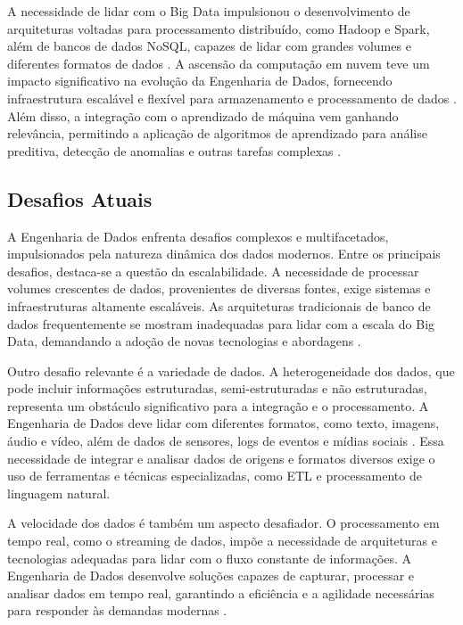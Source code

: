 A necessidade de lidar com o Big Data impulsionou o desenvolvimento de arquiteturas voltadas para processamento distribuído, como Hadoop e Spark, 
além de bancos de dados NoSQL, capazes de lidar com grandes volumes e diferentes formatos de dados \cite{volk2019challenging}. A ascensão da computação em nuvem 
teve um impacto significativo na evolução da Engenharia de Dados, fornecendo infraestrutura escalável e flexível para armazenamento e processamento de dados \cite{katal2013big}. 
Além disso, a integração com o aprendizado de máquina vem ganhando relevância, permitindo a aplicação de algoritmos de aprendizado para análise 
preditiva, detecção de anomalias e outras tarefas complexas \cite{lheureux2017machine}.

\subsection{Desafios Atuais}

A Engenharia de Dados enfrenta desafios complexos e multifacetados, impulsionados pela natureza dinâmica 
dos dados modernos. Entre os principais desafios, destaca-se a questão da escalabilidade. A necessidade de 
processar volumes crescentes de dados, provenientes de diversas fontes, exige sistemas e infraestruturas 
altamente escaláveis. As arquiteturas tradicionais de banco de dados frequentemente se mostram inadequadas 
para lidar com a escala do Big Data, demandando a adoção de novas tecnologias e abordagens \cite{katal2013big}.

Outro desafio relevante é a variedade de dados. A heterogeneidade dos dados, que pode incluir informações 
estruturadas, semi-estruturadas e não estruturadas, representa um obstáculo significativo para a integração 
e o processamento. A Engenharia de Dados deve lidar com diferentes formatos, como texto, imagens, áudio e 
vídeo, além de dados de sensores, logs de eventos e mídias sociais \cite{volk2019challenging}. Essa necessidade de integrar e analisar 
dados de origens e formatos diversos exige o uso de ferramentas e técnicas especializadas, como ETL e 
processamento de linguagem natural.

A velocidade dos dados é também um aspecto desafiador. O processamento em tempo real, como o streaming de dados, 
impõe a necessidade de arquiteturas e tecnologias adequadas para lidar com o fluxo constante de informações. 
A Engenharia de Dados desenvolve soluções capazes de capturar, processar 
e analisar dados em tempo real, garantindo a eficiência e a agilidade necessárias para responder às demandas modernas \cite{lheureux2017machine}.

